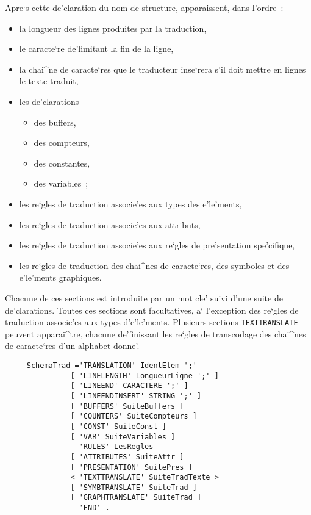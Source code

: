 {Apre`s cette de'claration du nom de structure, apparaissent, dans l'ordre~:
\begin{itemize}
\item la longueur des lignes produites par la traduction,
\item le caracte`re de'limitant la fin de la ligne,
\item la chai^ne de caracte`res que le traducteur inse`rera s'il doit
mettre en lignes le texte traduit,
\item les de'clarations
   \begin{itemize}
   \item des buffers,
   \item des compteurs,
   \item des constantes,
   \item des variables~;
   \end{itemize}
\item les re`gles de traduction associe'es aux types des e'le'ments,
\item les re`gles de traduction associe'es aux attributs,
\item les re`gles de traduction associe'es aux re`gles de pre'sentation
      spe'cifique,
\item les re`gles de traduction des chai^nes de caracte`res, des symboles et
      des e'le'ments graphiques.
\end{itemize}

Chacune de ces sections est introduite par un mot cle' suivi d'une suite de
de'clarations. Toutes ces sections sont facultatives, a` l'exception des
re`gles de traduction associe'es aux types d'e'le'ments. Plusieurs sections
{\tt TEXTTRANSLATE} peuvent apparai^tre, chacune de'finissant les re`gles
de transcodage des chai^nes de caracte`res d'un alphabet donne'.

\begin{verbatim}
     SchemaTrad ='TRANSLATION' IdentElem ';'
               [ 'LINELENGTH' LongueurLigne ';' ]
               [ 'LINEEND' CARACTERE ';' ]
               [ 'LINEENDINSERT' STRING ';' ]
               [ 'BUFFERS' SuiteBuffers ]
               [ 'COUNTERS' SuiteCompteurs ]
               [ 'CONST' SuiteConst ]
               [ 'VAR' SuiteVariables ]
                 'RULES' LesRegles
               [ 'ATTRIBUTES' SuiteAttr ]
               [ 'PRESENTATION' SuitePres ]
               < 'TEXTTRANSLATE' SuiteTradTexte >
               [ 'SYMBTRANSLATE' SuiteTrad ]
               [ 'GRAPHTRANSLATE' SuiteTrad ]
                 'END' .
\end{verbatim}

}

